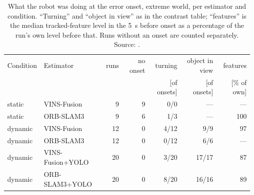 \begin{table}[htbp]
\centering
\small
\caption[What the robot was doing at the onset, extreme world.]{What the robot was doing at the error onset, extreme world, per estimator and condition. ``Turning'' and ``object in view'' as in the contrast table; ``features'' is the median tracked-feature level in the \SI{5}{\second} before onset as a percentage of the run's own level before that. Runs without an onset are counted separately. Source: .}
\label{tab:insight-onset-extreme}
\begin{tabular}{llrrrrr}
\toprule
Condition & Estimator & runs & no onset & turning & object in view & features \\
 & & & & [of onsets] & [of onsets] & [\si{\percent} of own] \\
\midrule
static & VINS-Fusion & 9 & 9 & 0/0 & --- & --- \\
static & ORB-SLAM3 & 9 & 6 & 1/3 & --- & 100 \\
dynamic & VINS-Fusion & 12 & 0 & 4/12 & 9/9 & 97 \\
dynamic & ORB-SLAM3 & 12 & 0 & 0/12 & 6/6 & --- \\
dynamic & VINS-Fusion+YOLO & 20 & 0 & 3/20 & 17/17 & 87 \\
dynamic & ORB-SLAM3+YOLO & 20 & 0 & 8/20 & 16/16 & 89 \\
\bottomrule
\end{tabular}
\end{table}
